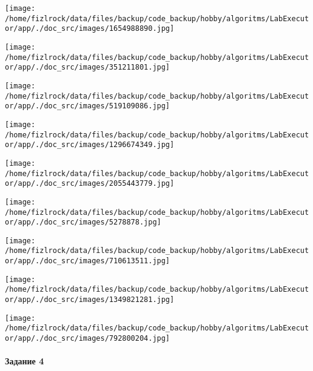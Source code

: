 \documentclass[a4paper, 12pt]{article}
\begin{document}
\texttt{[image: /home/fizlrock/data/files/backup/code\_backup/hobby/algoritms/LabExecutor/app/./doc\_src/images/1654988890.jpg]}

\texttt{[image: /home/fizlrock/data/files/backup/code\_backup/hobby/algoritms/LabExecutor/app/./doc\_src/images/351211801.jpg]}

\texttt{[image: /home/fizlrock/data/files/backup/code\_backup/hobby/algoritms/LabExecutor/app/./doc\_src/images/519109086.jpg]}

\texttt{[image: /home/fizlrock/data/files/backup/code\_backup/hobby/algoritms/LabExecutor/app/./doc\_src/images/1296674349.jpg]}

\texttt{[image: /home/fizlrock/data/files/backup/code\_backup/hobby/algoritms/LabExecutor/app/./doc\_src/images/2055443779.jpg]}

\texttt{[image: /home/fizlrock/data/files/backup/code\_backup/hobby/algoritms/LabExecutor/app/./doc\_src/images/5278878.jpg]}

\texttt{[image: /home/fizlrock/data/files/backup/code\_backup/hobby/algoritms/LabExecutor/app/./doc\_src/images/710613511.jpg]}

\texttt{[image: /home/fizlrock/data/files/backup/code\_backup/hobby/algoritms/LabExecutor/app/./doc\_src/images/1349821281.jpg]}

\texttt{[image: /home/fizlrock/data/files/backup/code\_backup/hobby/algoritms/LabExecutor/app/./doc\_src/images/792800204.jpg]}
\pagebreak
\paragraph{Задание 4}
\end{document}

